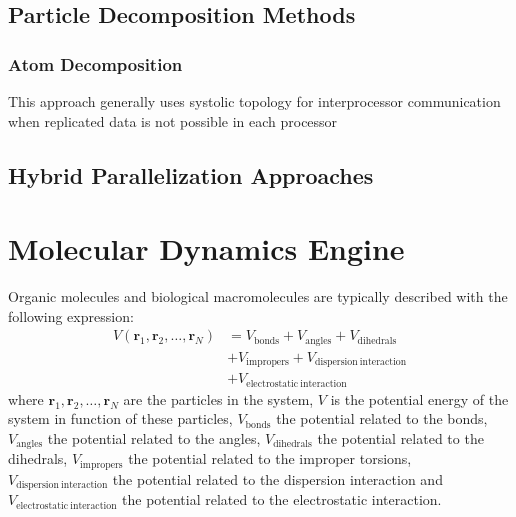 \documentclass[conference]{IEEEtran}
\begin{document}
        \subsection{Particle Decomposition Methods}
        \subsubsection{Atom Decomposition}
        This approach generally uses systolic topology for interprocessor communication when replicated data is not 
        possible in each processor

\subsection{Hybrid Parallelization Approaches}

\section{Molecular Dynamics Engine}

Organic molecules and biological macromolecules are typically described with the following expression:
\begin{equation}
    \begin{aligned}
    V(\mathbf{r}_1,\mathbf{r}_2,\ldots,\mathbf{r}_N) &= V_{\mathrm{bonds}} + V_{\mathrm{angles}} + 
                                                        V_{\mathrm{dihedrals}}\\
                                                    &+ V_{\mathrm{impropers}} + V_{\mathrm{dispersion \: interaction}}\\
                                                    &+ V_{\mathrm{electrostatic \: interaction}}
    \end{aligned}
\end{equation}
where $\mathbf{r}_1,\mathbf{r}_2,\ldots,\mathbf{r}_N$ are the particles in the system, $V$ is the potential energy of the
system in function of these particles, $V_{\mathrm{bonds}}$ the potential related to the bonds, $V_{\mathrm{angles}}$ 
the potential related to the angles, $V_{\mathrm{dihedrals}}$ the potential related to the dihedrals, 
$V_{\mathrm{impropers}}$ the potential related to the improper torsions, $V_{\mathrm{dispersion \: interaction}}$ 
the potential related to the dispersion interaction and $V_{\mathrm{electrostatic \: interaction}}$ the potential 
related to the electrostatic interaction. 
\end{document}
